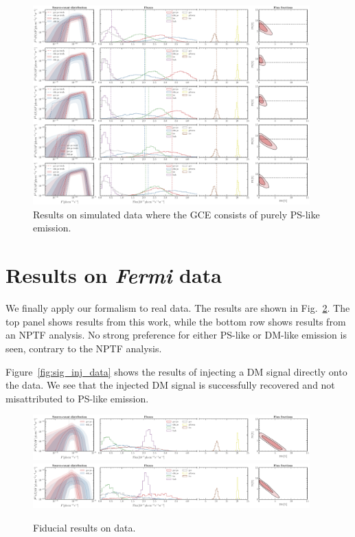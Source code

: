 \documentclass[prd,aps,10pt,nofootinbib,twocolumn,superscriptaddress,preprintnumbers,balancelastpage,longbibliography]{revtex4-1}
\begin{document}
%
\begin{figure}
    \centering
    \includegraphics[width=0.95\textwidth]{plots/sim_sbi_ps.pdf}
    \caption{Results on simulated data where the GCE consists of purely PS-like emission.}
    \label{fig:sim_sbi_ps}
\end{figure}
%

\section{Results on \emph{Fermi} data}
\label{sec:data}

We finally apply our formalism to real \Fermi data. The results are shown in Fig.~\ref{fig:fid_data}. The top panel shows results from this work, while the bottom row shows results from an NPTF analysis. No strong preference for either PS-like or DM-like emission is seen, contrary to the NPTF analysis.

Figure~\ref{fig:sig_inj_data} shows the results of injecting a DM signal directly onto the \Fermi data. We see that the injected DM signal is successfully recovered and not misattributed to PS-like emission.

%
\begin{figure}
    \centering
    \includegraphics[width=0.95\textwidth]{plots/data_fid_sbi.pdf}
    \includegraphics[width=0.95\textwidth]{plots/data_fid_nptf.pdf}
    \caption{Fiducial results on data.}
    \label{fig:fid_data}
\end{figure}
%
\end{document}
